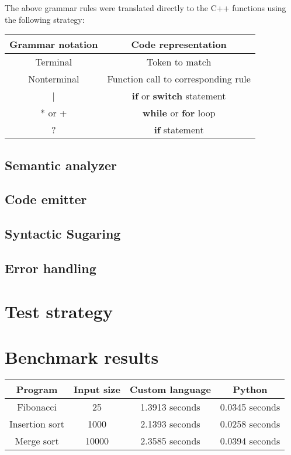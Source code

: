 \documentclass[manuscript,screen,nonacm]{acmart}
\begin{document}
The above grammar rules were translated directly to the C++ functions using the following strategy:

\begin{center}
\begin{tabular}{|c|c|}
    \hline
    Grammar notation & Code representation \\
    \hline
    Terminal & Token to match \\
    Nonterminal & Function call to corresponding rule \\
    | & \textbf{if} or \textbf{switch} statement \\
    * or + & \textbf{while} or \textbf{for} loop \\
    ? & \textbf{if} statement \\
    \hline
\end{tabular}
\end{center}



\subsection{Semantic analyzer}

\subsection{Code emitter}

\subsection{Syntactic Sugaring}

\subsection{Error handling}


\section{Test strategy}


\section{Benchmark results}

\begin{center}
\begin{tabular}{|c|c|c|c|}
    \hline
    Program & Input size & Custom language & Python \\
    \hline
    Fibonacci & 25 & 1.3913 seconds & 0.0345 seconds \\
    Insertion sort & 1000 & 2.1393 seconds & 0.0258 seconds \\
    Merge sort & 10000 & 2.3585 seconds & 0.0394 seconds \\
    \hline
\end{tabular}
\end{center}
\end{document}
